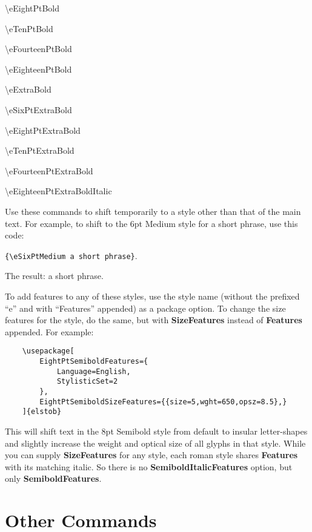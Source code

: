 \documentclass[12pt]{article}
\begin{document}
\begin{multicols}{2}
\noindent\textbackslash eEightPtBold

\noindent\textbackslash eTenPtBold

\noindent\textbackslash eFourteenPtBold

\noindent\textbackslash eEighteenPtBold

\noindent\textbackslash eExtraBold

\noindent\textbackslash eSixPtExtraBold

\noindent\textbackslash eEightPtExtraBold

\noindent\textbackslash eTenPtExtraBold

\noindent\textbackslash eFourteenPtExtraBold

\noindent\textbackslash eEighteenPtExtraBoldItalic
\end{multicols}

\noindent Use these commands
to shift temporarily to a style other than that of the main text.
For example, to shift to the 6pt Medium style for a short phrase, use
this code:
\begin{center}
{\color{BrickRed}\small\verb|{\eSixPtMedium a short phrase}|}.
\end{center}
The result: {\eSixPtMedium a short phrase}.

To add features to any of these styles, use the style name
(without the prefixed “e” and with “Features” appended)
as a package option. To change the size features for the style,
do the same, but with \textbf{SizeFeatures} instead of \textbf{Features}
appended. For example:

\footnotesize
\begin{verbatim}
    \usepackage[
        EightPtSemiboldFeatures={
            Language=English,
            StylisticSet=2
        },
        EightPtSemiboldSizeFeatures={{size=5,wght=650,opsz=8.5},}
    ]{elstob}
\end{verbatim}\normalsize

\noindent This will shift text in the 8pt Semibold style from default to insular
letter-shapes and slightly increase the weight and optical size of all glyphs in that style.
While you can supply \textbf{SizeFeatures} for any style, each roman style shares
\textbf{Features} with its matching italic. So there is no \textbf{SemiboldItalicFeatures}
option, but only \textbf{SemiboldFeatures}.

\section{Other Commands}
\end{document}
